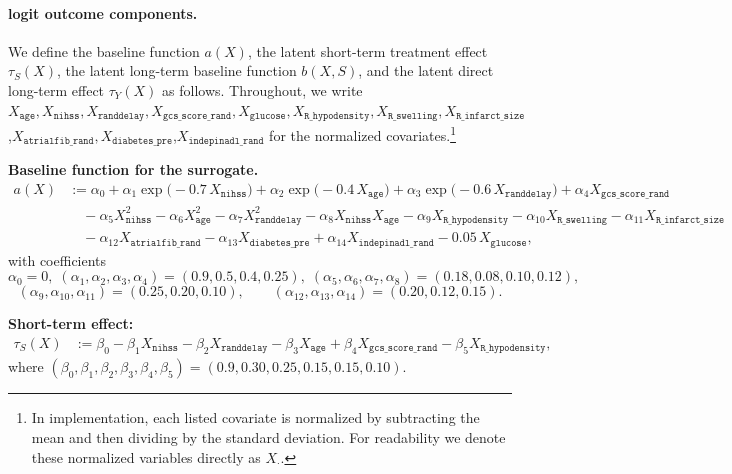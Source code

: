 \documentclass{article}
\theoremstyle{plain}
\theoremstyle{definition}
\theoremstyle{remark}
\newcommand{\1}{\mathds{1}}                %
\begin{document}
\paragraph{logit outcome components.}
We define the baseline function $a(X)$, the latent short-term treatment effect $\tau_S(X)$, the latent long-term baseline function $b(X,S)$, and the latent direct long-term effect $\tau_Y(X)$ as follows.
Throughout, we write $X_{\texttt{age}},X_{\texttt{nihss}},X_{\texttt{randdelay}},X_{\texttt{gcs\_score\_rand}},X_{\texttt{glucose}},X_{\texttt{R\_hypodensity}},X_{\texttt{R\_swelling}},X_{\texttt{R\_infarct\_size}}$ ,$X_{\texttt{atrialfib\_rand}}$$,X_{\texttt{diabetes\_pre}}$,$X_{\texttt{indepinadl\_rand}}$ for the normalized covariates.\footnote{In implementation, each listed covariate is normalized by subtracting the mean and then dividing by the standard deviation. For readability we denote these normalized variables directly as $X_{\cdot}$.}

\textbf{Baseline function for the surrogate.}
\begin{align}
a(X)
&:= \alpha_0
+ \alpha_1 \exp\!\big(-0.7\,X_{\texttt{nihss}}\big)
+ \alpha_2 \exp\!\big(-0.4\,X_{\texttt{age}}\big)
+ \alpha_3 \exp\!\big(-0.6\,X_{\texttt{randdelay}}\big)
+ \alpha_4 X_{\texttt{gcs\_score\_rand}}
\nonumber\\
&\quad
- \alpha_5 X_{\texttt{nihss}}^2
- \alpha_6 X_{\texttt{age}}^2
- \alpha_7 X_{\texttt{randdelay}}^2
- \alpha_8 X_{\texttt{nihss}}X_{\texttt{age}}
- \alpha_9 X_{\texttt{R\_hypodensity}}
- \alpha_{10} X_{\texttt{R\_swelling}}
- \alpha_{11} X_{\texttt{R\_infarct\_size}}
\nonumber\\
&\quad
- \alpha_{12} X_{\texttt{atrialfib\_rand}}
- \alpha_{13} X_{\texttt{diabetes\_pre}}
+ \alpha_{14} X_{\texttt{indepinadl\_rand}}
- 0.05\,X_{\texttt{glucose}},
\end{align}
with coefficients
\[
\alpha_0=0,\;
(\alpha_1,\alpha_2,\alpha_3,\alpha_4)=(0.9,0.5,0.4,0.25),\;
(\alpha_5,\alpha_6,\alpha_7,\alpha_8)=(0.18,0.08,0.10,0.12),
\]
\[
(\alpha_9,\alpha_{10},\alpha_{11})=(0.25,0.20,0.10),\qquad
(\alpha_{12},\alpha_{13},\alpha_{14})=(0.20,0.12,0.15).
\]

\textbf{Short-term effect:}
\begin{align}
\tau_S(X)
&:= \beta_0
- \beta_1 X_{\texttt{nihss}}
- \beta_2 X_{\texttt{randdelay}}
- \beta_3 X_{\texttt{age}}
+ \beta_4 X_{\texttt{gcs\_score\_rand}}
- \beta_5 X_{\texttt{R\_hypodensity}},
\end{align}
where $(\beta_0,\beta_1,\beta_2,\beta_3,\beta_4,\beta_5)=(0.9,0.30,0.25,0.15,0.15,0.10)$.
\end{document}

